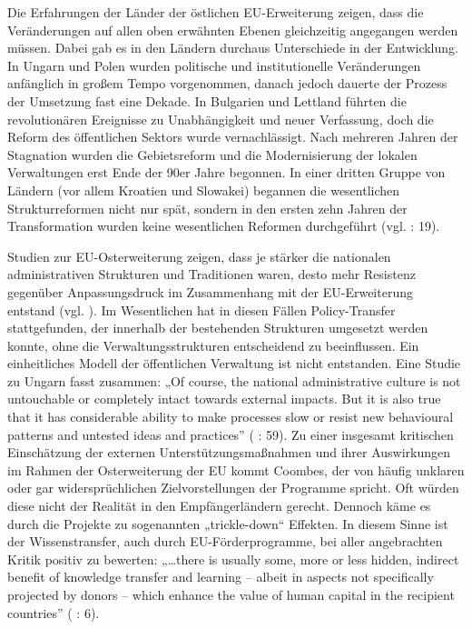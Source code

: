 Die Erfahrungen der Länder der östlichen EU-Erweiterung zeigen, dass die Veränderungen auf allen oben erwähnten Ebenen gleichzeitig angegangen werden müssen. Dabei gab es in den Ländern durchaus Unterschiede in der Entwicklung. In Ungarn und Polen wurden politische und institutionelle Veränderungen anfänglich in großem Tempo vorgenommen, danach jedoch dauerte der Prozess der Umsetzung fast eine Dekade. In Bulgarien und Lettland führten die revolutionären Ereignisse zu Unabhängigkeit und neuer Verfassung, doch die Reform des öffentlichen Sektors wurde vernachlässigt. Nach mehreren Jahren der Stagnation wurden die Gebietsreform und die Modernisierung der lokalen Verwaltungen erst Ende der 90er Jahre begonnen. In einer dritten Gruppe von Ländern (vor allem Kroatien und Slowakei) begannen die wesentlichen Strukturreformen nicht nur spät, sondern in den ersten zehn Jahren der Transformation wurden keine wesentlichen Reformen durchgeführt (vgl. \cite{petzen} : 19).  \par

Studien zur EU-Osterweiterung zeigen, dass je stärker die nationalen administrativen Strukturen und Traditionen waren, desto mehr Resistenz gegenüber Anpassungsdruck im Zusammenhang mit der EU-Erweiterung entstand (vgl. \cite{knill01, goetz01b}). Im Wesentlichen hat in diesen Fällen Policy-Transfer stattgefunden, der innerhalb der bestehenden Strukturen umgesetzt werden konnte, ohne die Verwaltungsstrukturen entscheidend zu beeinflussen. Ein einheitliches Modell der öffentlichen Verwaltung ist nicht entstanden. Eine Studie zu Ungarn fasst zusammen: „Of course, the national administrative culture is not untouchable or completely intact towards external impacts. But it is also true that it has considerable ability to make processes slow or resist new behavioural patterns and untested ideas and practices” (\cite{szente} : 59). Zu einer insgesamt kritischen Einschätzung der externen Unterstützungsmaßnahmen und ihrer Auswirkungen im Rahmen der Osterweiterung der EU kommt Coombes, der von häufig unklaren oder gar widersprüchlichen Zielvorstellungen der Programme spricht. Oft würden diese nicht der Realität in den Empfängerländern gerecht. Dennoch käme es durch die Projekte zu sogenannten „trickle-down“ Effekten. In diesem Sinne ist der Wissenstransfer, auch durch EU-Förderprogramme, bei aller angebrachten Kritik positiv zu bewerten: „…there is usually some, more or less hidden, indirect benefit of knowledge transfer and learning – albeit in aspects not specifically projected by donors – which enhance the value of human capital in the recipient countries” (\cite{coombes} : 6). \par

